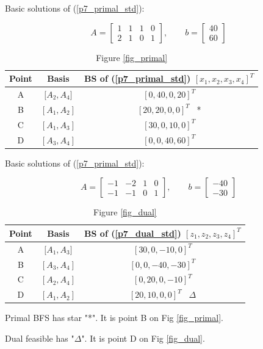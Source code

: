 \documentclass[12pt]{article}
\begin{document}
\FloatBarrier

Basic solutions of (\ref{p7_primal_std}):

$$
A = \begin{bmatrix}
1 & 1 & 1 & 0 \\
2 & 1 & 0 & 1
\end{bmatrix},  \qquad b = \begin{bmatrix}
40 \\ 60
\end{bmatrix}
$$

\FloatBarrier

\begin{table}[htbp]
\centering
\caption{Figure \ref{fig_primal}}
\label{BStable_primal}
\begin{tabular}{||c|c|c||}
\hline
 Point & Basis        & BS of (\ref{p7_primal_std}) $[x_1, x_2, x_3, x_4]^T$    \\
 \hline
A & ${[}A_2, A_4{]}$ & $[0, 40, 0, 20]^T$     \\
 \hline
B  &  $[A_1, A_2]$   & $ [20, 20, 0, 0]^T $  \ *  \\
 \hline
C  &  $[A_1, A_3]$   & $ [30, 0, 10, 0]^T $    \\
 \hline
D  &  $[A_3, A_4]$   & $ [0, 0, 40, 60]^T $    \\
\hline
\end{tabular}
\end{table}

\FloatBarrier

Basic solutions of (\ref{p7_primal_std}):

$$
A = \begin{bmatrix}
-1 & -2 & 1 & 0 \\
-1 & -1 & 0 & 1
\end{bmatrix},  \qquad b = \begin{bmatrix}
-40 \\ -30
\end{bmatrix}
$$

\FloatBarrier

\begin{table}[htbp]
\centering
\caption{Figure \ref{fig_dual}}
\label{BStable_dual}
\begin{tabular}{||c|c|c||}
\hline
 Point & Basis        & BS of (\ref{p7_dual_std}) $[z_1, z_2, z_3, z_4]^T$    \\
 \hline
A & ${[}A_1, A_3{]}$ & $[30, 0, -10, 0]^T$      \\
 \hline
B  &  $[A_3, A_4]$   & $ [0, 0, -40, -30]^T $    \\
 \hline
C  &  $[A_2, A_4]$   & $ [0, 20, 0, -10]^T $    \\
 \hline
D  &  $[A_1, A_2]$   & $ [20, 10, 0, 0]^T $  \ $\Delta$  \\
\hline
\end{tabular}
\end{table}
\FloatBarrier


Primal BFS has star "*". It is point B on Fig \ref{fig_primal}.

Dual feasible has "$\Delta$". It is point D on Fig \ref{fig_dual}.
\end{document}
